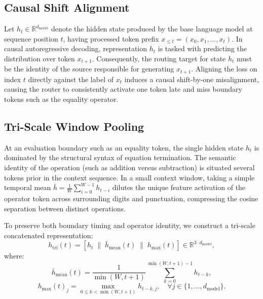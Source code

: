 \documentclass[preprint,12pt]{elsarticle}
\begin{document}
\subsection{Causal Shift Alignment}

Let $h_t \in \mathbb{R}^{d_{\mathrm{model}}}$ denote the hidden state produced by the base language model at sequence position $t$, having processed token prefix $x_{\le t} = (x_0, x_1, \dots, x_t)$. In causal autoregressive decoding, representation $h_t$ is tasked with predicting the distribution over token $x_{t+1}$. Consequently, the routing target for state $h_t$ must be the identity of the source responsible for generating $x_{t+1}$. Aligning the loss on index $t$ directly against the label of $x_t$ induces a causal shift-by-one misalignment, causing the router to consistently activate one token late and miss boundary tokens such as the equality operator.

\subsection{Tri-Scale Window Pooling}

At an evaluation boundary such as an equality token, the single hidden state $h_t$ is dominated by the structural syntax of equation termination. The semantic identity of the operation (such as addition versus subtraction) is situated several tokens prior in the context sequence. In a small context window, taking a simple temporal mean $\bar{h} = \frac{1}{W} \sum_{i=0}^{W-1} h_{t-i}$ dilutes the unique feature activation of the operator token across surrounding digits and punctuation, compressing the cosine separation between distinct operations.

To preserve both boundary timing and operator identity, we construct a tri-scale concatenated representation:
\begin{equation}
h_{\mathrm{tri}}(t) = \left[ h_t \;\Big\|\; \bar{h}_{\mathrm{mean}}(t) \;\Big\|\; h_{\mathrm{max}}(t) \right] \in \mathbb{R}^{3 \cdot d_{\mathrm{model}}},
\end{equation}
where:
\begin{equation}
\bar{h}_{\mathrm{mean}}(t) = \frac{1}{\min(W, t+1)} \sum_{k=0}^{\min(W, t+1)-1} h_{t-k},
\end{equation}
\begin{equation}
h_{\mathrm{max}}(t)_j = \max_{0 \le k < \min(W, t+1)} h_{t-k, j}, \quad \forall j \in \{1, \dots, d_{\mathrm{model}}\}.
\end{equation}
\end{document}
